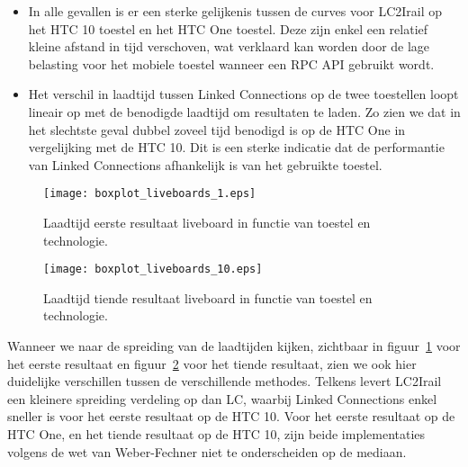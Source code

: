 \begin{itemize}
	\item In alle gevallen is er een sterke gelijkenis tussen de curves voor LC2Irail op het HTC 10 toestel en het HTC One toestel. Deze zijn enkel een relatief kleine afstand in tijd verschoven, wat verklaard kan worden door de lage belasting voor het mobiele toestel wanneer een RPC API gebruikt wordt.

	\item Het verschil in laadtijd tussen Linked Connections op de twee toestellen loopt lineair op met de benodigde laadtijd om resultaten te laden. Zo zien we dat in het slechtste geval dubbel zoveel tijd benodigd is op de HTC One in vergelijking met de HTC 10. Dit is een sterke indicatie dat de performantie van Linked Connections afhankelijk is van het gebruikte toestel.
\end{itemize}

\begin{figure}[h]
	\centering
	\texttt{[image: boxplot\_liveboards\_1.eps]}
	\caption[Laadtijd eerste resultaat liveboard in functie van toestel en technologie]{Laadtijd eerste resultaat liveboard in functie van toestel en technologie.}
	\label{fig:liveboardsBoxplot1}
\end{figure}

\begin{figure}[h]
	\centering
	\texttt{[image: boxplot\_liveboards\_10.eps]}
	\caption[Laadtijd tiende resultaat liveboard in functie van toestel en technologie]{Laadtijd tiende resultaat liveboard in functie van toestel en technologie.}
	\label{fig:liveboardsBoxplot10}
\end{figure}

Wanneer we naar de spreiding van de laadtijden kijken, zichtbaar in figuur~\ref{fig:liveboardsBoxplot1} voor het eerste resultaat en figuur~\ref{fig:liveboardsBoxplot10} voor het tiende resultaat, zien we ook hier duidelijke verschillen tussen de verschillende methodes. Telkens levert LC2Irail een kleinere spreiding verdeling op dan LC, waarbij Linked Connections enkel sneller is voor het eerste resultaat op de HTC 10. Voor het eerste resultaat op de HTC One, en het tiende resultaat op de HTC 10, zijn beide implementaties volgens de wet van Weber-Fechner niet te onderscheiden op de mediaan.


